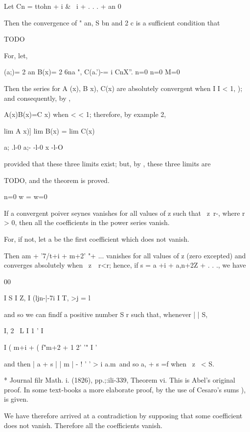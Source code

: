 Let Cn = ttohn + i \& \ i + . . . + an 0

Then the convergence of " an, S bn and 2 c is a sufficient condition
that

TODO

For, let,

 (a;)= 2 an B(x)= 2 6na ", C(a.')-= i CnX''. n=0 n=0 M=0

Then the series for A (x), B x), C(x) are absolutely convergent when I
I < 1, ); and consequently, by ,

A(x)B(x)=C x) when < < 1; therefore, by  example 2,

  lim A x)] lim B(x) = lim C(x)\

a; .l-0 a;- -l-0 x -l-O

provided that these three limits exist; but, by , these three
limits are

TODO, and the theorem is proved.

n=0 w = w=0


If a convergent poiver seynes vanishes for all values of z such that \
z\ r-, where r > 0, then all the coefficients in the power series
vanish.

For, if not, let a be the first coefficient which does not vanish.

Then am + '7/t+i + m+2' "+ ... vanishes for all values of z (zero
excepted) and converges absolutely when \ z\ \ r<r; hence, if s = a
+i + a,n+2Z + . . ., we have

00

I S I Z, I (ljn-|-7i I T, >j = l

and so we can findf a positive number S r such that, whenever | | S,

I, 2 \ L I 1 ' I

I ( m+i + ( f"m+2 +    1 2' '" I '

and then | a + s | | m | - ! ' ' > i a.m\, and so a, + s =f when \ z
\ < S.

* Journal filr Math. i. (1826), pp.;:ili-339, Theorem vi. This is
Abel's original proof. In some text-books a more elaborate proof, by
the use of Cesaro's sums \hardsubsectionref{8}{4}{3}), is given.

%
%

We have therefore arrived at a contradiction by supposing that some
coefficient does not vanish. Therefore all the coefficients vanish.

